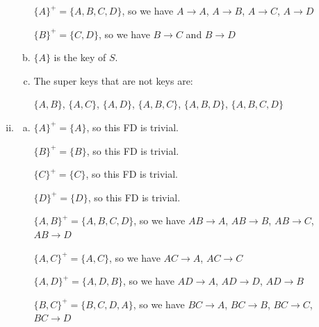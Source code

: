 \documentclass[12pt]{article}
\begin{document}
\begin{enumerate}[1.]
\begin{enumerate}[i)]
\begin{enumerate}[a)]
            $\{A\}^+ = \{A,B,C,D\}$, so we have $A \to A$, $A \to B$, $A \to C$, $A \to D$

            \bigskip

            $\{B\}^+ = \{C,D\}$, so we have $B \to C$ and $B \to D$

            \item

            $\{A\}$ is the key of $S$.

            \item

            The super keys that are not keys are:

            \bigskip

            $\{A,B\}$, $\{A,C\}$, $\{A,D\}$, $\{A,B,C\}$, $\{A,B,D\}$, $\{A,B,C,D\}$
        \end{enumerate}

        \item

        \begin{enumerate}[a)]
            \item

            \bigskip

            $\{A\}^+ = \{A\}$, so this FD is trivial.

            \bigskip

            $\{B\}^+ = \{B\}$, so this FD is trivial.

            \bigskip

            $\{C\}^+ = \{C\}$, so this FD is trivial.

            \bigskip

            $\{D\}^+ = \{D\}$, so this FD is trivial.

            \bigskip

            $\{A,B\}^+ = \{A,B,C,D\}$, so we have $AB \to A$, $AB \to B$, $AB \to C$, $AB \to D$

            \bigskip

            $\{A,C\}^+ = \{A,C\}$, so we have $AC \to A$, $AC \to C$

            \bigskip

            $\{A,D\}^+ = \{A,D,B\}$, so we have $AD \to A$, $AD \to D$, $AD \to B$

            \bigskip

            $\{B,C\}^+ = \{B,C,D,A\}$, so we have $BC \to A$, $BC \to B$, $BC \to C$, $BC \to D$

            \bigskip


\end{enumerate}
\end{enumerate}
\end{enumerate}
\end{document}
